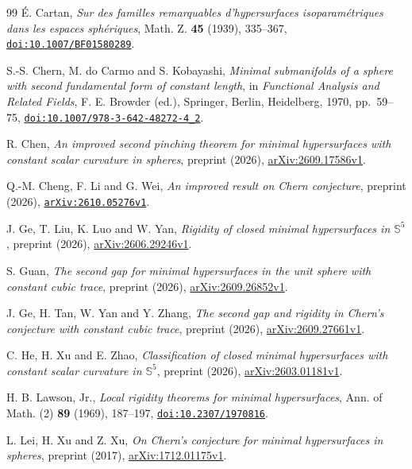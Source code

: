 \documentclass[11pt,a4paper]{amsart}
\numberwithin{equation}{section}
\theoremstyle{definition}
\theoremstyle{remark}
\newcommand{\Sph}{\mathbb S}
\begin{document}
\begin{thebibliography}{99}
\'{E}. Cartan,
\emph{Sur des familles remarquables d'hypersurfaces isoparam\'etriques dans les espaces sph\'eriques},
Math. Z. \textbf{45} (1939), 335--367,
\href{https://doi.org/10.1007/BF01580289}{\nolinkurl{doi:10.1007/BF01580289}}.

S.-S. Chern, M. do Carmo and S. Kobayashi,
\emph{Minimal submanifolds of a sphere with second fundamental form of constant length},
in \emph{Functional Analysis and Related Fields}, F. E. Browder (ed.),
Springer, Berlin, Heidelberg, 1970, pp.~59--75,
\href{https://doi.org/10.1007/978-3-642-48272-4_2}{\nolinkurl{doi:10.1007/978-3-642-48272-4_2}}.

R. Chen,
\emph{An improved second pinching theorem for minimal hypersurfaces with constant scalar curvature in spheres},
preprint (2026), \href{https://arxiv.org/abs/2609.17586v1}{arXiv:2609.17586v1}.

Q.-M. Cheng, F. Li and G. Wei,
\emph{An improved result on Chern conjecture},
preprint (2026), \href{https://arxiv.org/abs/2610.05276v1}{\nolinkurl{arXiv:2610.05276v1}}.

J. Ge, T. Liu, K. Luo and W. Yan,
\emph{Rigidity of closed minimal hypersurfaces in $\Sph^5$},
preprint (2026), \href{https://arxiv.org/abs/2606.29246v1}{arXiv:2606.29246v1}.

S. Guan,
\emph{The second gap for minimal hypersurfaces in the unit sphere with constant cubic trace},
preprint (2026), \href{https://arxiv.org/abs/2609.26852v1}{arXiv:2609.26852v1}.

J. Ge, H. Tan, W. Yan and Y. Zhang,
\emph{The second gap and rigidity in Chern's conjecture with constant cubic trace},
preprint (2026), \href{https://arxiv.org/abs/2609.27661v1}{arXiv:2609.27661v1}.

C. He, H. Xu and E. Zhao,
\emph{Classification of closed minimal hypersurfaces with constant scalar curvature in $\Sph^5$},
preprint (2026), \href{https://arxiv.org/abs/2603.01181v1}{arXiv:2603.01181v1}.

H. B. Lawson, Jr.,
\emph{Local rigidity theorems for minimal hypersurfaces},
Ann. of Math. (2) \textbf{89} (1969), 187--197,
\href{https://doi.org/10.2307/1970816}{\nolinkurl{doi:10.2307/1970816}}.

L. Lei, H. Xu and Z. Xu,
\emph{On Chern's conjecture for minimal hypersurfaces in spheres},
preprint (2017), \href{https://arxiv.org/abs/1712.01175v1}{arXiv:1712.01175v1}.


\end{thebibliography}
\end{document}
